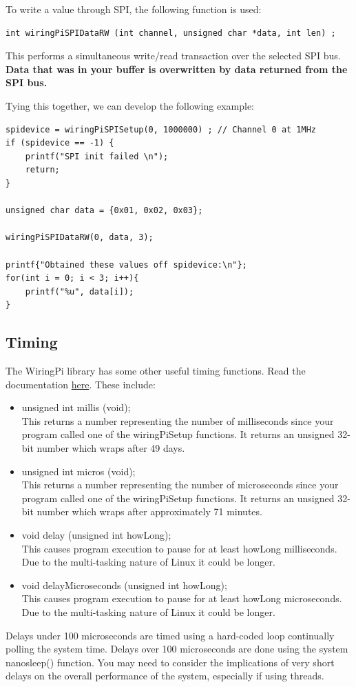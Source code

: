 To write a value through SPI, the following function is used:
\begin{lstlisting}
int wiringPiSPIDataRW (int channel, unsigned char *data, int len) ;
\end{lstlisting}
This performs a simultaneous write/read transaction over the selected SPI bus. \textbf{Data that was in your buffer is overwritten by data returned from the SPI bus.}

Tying this together, we can develop the following example:
\begin{lstlisting}
spidevice = wiringPiSPISetup(0, 1000000) ; // Channel 0 at 1MHz
if (spidevice == -1) {
    printf("SPI init failed \n");
    return;
}

unsigned char data = {0x01, 0x02, 0x03};

wiringPiSPIDataRW(0, data, 3);

printf{"Obtained these values off spidevice:\n"};
for(int i = 0; i < 3; i++){
    printf("%u", data[i]);
}

\end{lstlisting}

\subsection{Timing}
The WiringPi library has some other useful timing functions. Read the documentation \href{http://wiringpi.com/reference/timing/}{here}. These include:
\begin{itemize}
    \item unsigned int millis (void);\\
        This returns a number representing the number of milliseconds since your program called one of the wiringPiSetup functions. It returns an unsigned 32-bit number which wraps after 49 days.
    \item unsigned int micros (void);\\
        This returns a number representing the number of microseconds since your program called one of the wiringPiSetup functions. It returns an unsigned 32-bit number which wraps after approximately 71 minutes.
    \item void delay (unsigned int howLong);\\
        This causes program execution to pause for at least howLong milliseconds. Due to the multi-tasking nature of Linux it could be longer.
    \item void delayMicroseconds (unsigned int howLong);\\
        This causes program execution to pause for at least howLong microseconds. Due to the multi-tasking nature of Linux it could be longer.
\end{itemize}
Delays under 100 microseconds are timed using a hard-coded loop continually polling the system time. Delays over 100 microseconds are done using the system nanosleep() function. You may need to consider the implications of very short delays on the overall performance of the system, especially if using threads.

